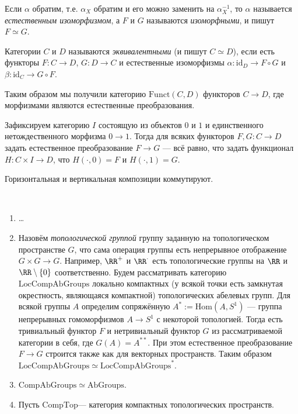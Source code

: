 \documentclass[12pt,a4paper]{article}
\newcommand{\Hom}{\mathrm{Hom}}
\newcommand{\id}{\mathrm{id}}
\newcommand{\AbGroups}{\mathrm{AbGroups}}
\newcommand{\Funct}{\mathrm{Funct}}
\newcommand{\LocCompAbGroups}{\ensuremath{\mathrm{LocCompAbGroups}}\xspace}
\newcommand{\CompAbGroups}{\ensuremath{\mathrm{CompAbGroups}}\xspace}
\newcommand{\CompTop}{\ensuremath{\mathrm{CompTop}}\xspace}
\begin{document}
\begin{definition}
        Если $\alpha$ обратим, т.е. $\alpha_X$ обратим и его можно заменить на $\alpha_X^{-1}$, то $\alpha$ называется \emph{естественным изоморфизмом}, а $F$ и $G$ называются \emph{изоморфными}, и пишут $F \simeq G$.

        Категории $C$ и $D$ называются \emph{эквивалентными} (и пишут $C \simeq D$), если есть функторы $F: C \to D$, $G: D \to C$ и естественные изоморфизмы $\alpha: \id_D \to F \circ G$ и $\beta: \id_C \to G \circ F$.
    \end{definition}

    \begin{remark}
        Таким образом мы получили категорию $\Funct(C, D)$ функторов $C \to D$, где морфизмами являются естественные преобразования.
    \end{remark}

    \begin{lemma}
        Зафиксируем категорию $I$ состоящую из объектов $0$ и $1$ и единственного нетождественного морфизма $0 \to 1$. Тогда для всяких функторов $F, G: C \to D$ задать естественное преобразование $F \to G$ --- всё равно, что задать функционал $H: C \times I \to D$, что $H({\cdot}, 0) = F$ и $H({\cdot}, 1) = G$.
    \end{lemma}

    \begin{lemma}
        Горизонтальная и вертикальная композиции коммутируют.
    \end{lemma}

    \begin{example}\ 
        \begin{enumerate}
            \item \dots
            \item Назовём \emph{топологической группой} группу заданную на топологическом пространстве $G$, что сама операция группы есть непрерывное отображение $G \times G \to G$. Например, $\RR^+$ и $\RR^\cdot$ есть топологические группы на $\RR$ и $\RR \setminus \{0\}$ соответственно. Будем рассматривать категорию \LocCompAbGroups локально компактных (у всякой точки есть замкнутая окрестность, являющаяся компактной) топологических абелевых групп. Для всякой группы $A$ определим сопряжённую $A^* := \Hom(A, S^1)$ --- группа непрерывных гомоморфизмов $A \to S^1$ с некоторой топологией. Тогда есть тривиальный функтор $F$ и нетривиальный функтор $G$ из рассматриваемой категории в себя, где $G(A) = A^{**}$. При этом естественное преобразование $F \to G$ строится также как для векторных пространств. Таким образом $\LocCompAbGroups \simeq \LocCompAbGroups^*$.
            \item $\CompAbGroups \simeq \AbGroups$.
            \item Пусть \CompTop --- категория компактных топологических пространств.
        \end{enumerate}
    \end{example}
\end{document}
